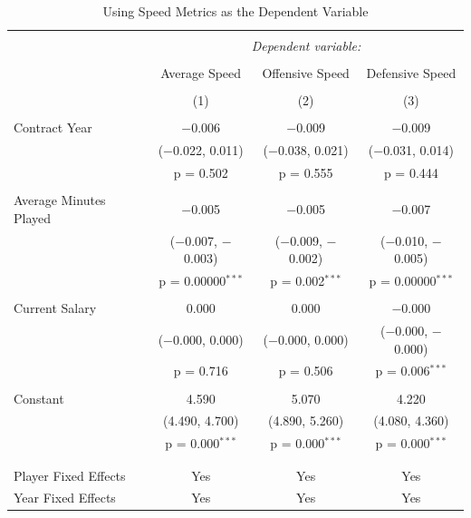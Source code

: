\documentclass[12pt]{article}
\begin{document}
	\begin{landscape}
		\begin{table}[!htbp] \centering 
			\caption{Using Speed Metrics as the Dependent Variable} 
			\label{} 
			\begin{tabular}{@{\extracolsep{5pt}}lccc} 
				\\[-1.8ex]\hline 
				\hline \\[-1.8ex] 
				& \multicolumn{3}{c}{\textit{Dependent variable:}} \\ 
				\cline{2-4} 
				\\[-1.8ex] & Average Speed & Offensive Speed & Defensive Speed \\ 
				\\[-1.8ex] & (1) & (2) & (3)\\ 
				\hline \\[-1.8ex] 
				Contract Year & $-$0.006 & $-$0.009 & $-$0.009 \\ 
				& ($-$0.022, 0.011) & ($-$0.038, 0.021) & ($-$0.031, 0.014) \\ 
				& p = 0.502 & p = 0.555 & p = 0.444 \\ 
				& & & \\ 
				Average Minutes Played & $-$0.005 & $-$0.005 & $-$0.007 \\ 
				& ($-$0.007, $-$0.003) & ($-$0.009, $-$0.002) & ($-$0.010, $-$0.005) \\ 
				& p = 0.00000$^{***}$ & p = 0.002$^{***}$ & p = 0.00000$^{***}$ \\ 
				& & & \\ 
				Current Salary & 0.000 & 0.000 & $-$0.000 \\ 
				& ($-$0.000, 0.000) & ($-$0.000, 0.000) & ($-$0.000, $-$0.000) \\ 
				& p = 0.716 & p = 0.506 & p = 0.006$^{***}$ \\ 
				& & & \\ 
				Constant & 4.590 & 5.070 & 4.220 \\ 
				& (4.490, 4.700) & (4.890, 5.260) & (4.080, 4.360) \\ 
				& p = 0.000$^{***}$ & p = 0.000$^{***}$ & p = 0.000$^{***}$ \\ 
				& & & \\ 
				\hline \\[-1.8ex] 
				Player Fixed Effects & Yes & Yes & Yes \\ 
				Year Fixed Effects & Yes & Yes & Yes \\ 

\end{tabular}
\end{table}
\end{landscape}
\end{document}
